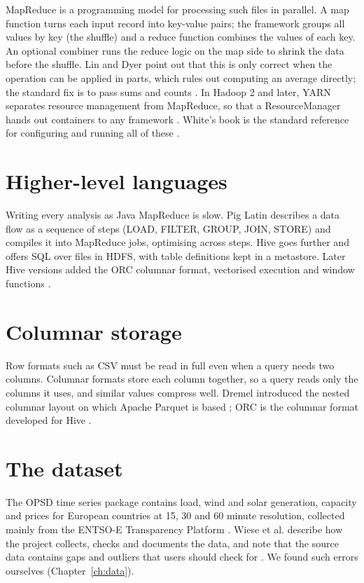 \documentclass[12pt,a4paper]{report}
\begin{document}
MapReduce \cite{dean2008} is a programming model for processing such files in parallel. A map function turns each input record into key-value pairs; the framework groups all values by key (the shuffle) and a reduce function combines the values of each key. An optional combiner runs the reduce logic on the map side to shrink the data before the shuffle. Lin and Dyer point out that this is only correct when the operation can be applied in parts, which rules out computing an average directly; the standard fix is to pass sums and counts \cite{lin2010}. In Hadoop 2 and later, YARN separates resource management from MapReduce, so that a ResourceManager hands out containers to any framework \cite{yarn2013}. White's book is the standard reference for configuring and running all of these \cite{white2015}.

\section{Higher-level languages}
Writing every analysis as Java MapReduce is slow. Pig Latin \cite{olston2008} describes a data flow as a sequence of steps (LOAD, FILTER, GROUP, JOIN, STORE) and compiles it into MapReduce jobs, optimising across steps. Hive \cite{thusoo2009} goes further and offers SQL over files in HDFS, with table definitions kept in a metastore. Later Hive versions added the ORC columnar format, vectorised execution and window functions \cite{huai2014}.

\section{Columnar storage}
Row formats such as CSV must be read in full even when a query needs two columns. Columnar formats store each column together, so a query reads only the columns it uses, and similar values compress well. Dremel introduced the nested columnar layout \cite{melnik2010} on which Apache Parquet is based \cite{parquet}; ORC is the columnar format developed for Hive \cite{huai2014}.

\section{The dataset}
The OPSD time series package \cite{opsd2020} contains load, wind and solar generation, capacity and prices for European countries at 15, 30 and 60 minute resolution, collected mainly from the ENTSO-E Transparency Platform \cite{entsoe}. Wiese et al. describe how the project collects, checks and documents the data, and note that the source data contains gaps and outliers that users should check for \cite{wiese2019}. We found such errors ourselves (Chapter~\ref{ch:data}).
\end{document}
